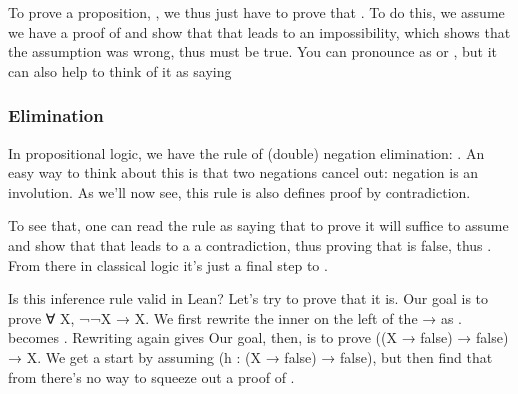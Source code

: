 \documentclass[letterpaper,10pt,english]{sphinxmanual}
\begin{document}
\sphinxAtStartPar
To prove a proposition, , we thus just have to prove that
. To do this, we assume we have a proof of  and
show that that leads to an impossibility, which shows that the
assumption was wrong, thus  must be true. You can pronounce
 as  or , but it can also help to think
of it as saying 

\begin{sphinxVerbatim}[commandchars=\\\{\}]
       
 
 

      
 
 

     
 
 
\end{sphinxVerbatim}


\subsubsection{Elimination}
\label{\detokenize{A_02_Constructive_Logic:elimination}}
\sphinxAtStartPar
In propositional logic, we have the rule of (double) negation
elimination: . An easy way to think about this is that
two negations cancel out: negation is an involution. As we’ll
now see, this rule is also defines proof by contradiction.

\sphinxAtStartPar
To see that, one can read the rule as saying that to prove 
it will suffice to assume  and show that that leads to a
a contradiction, thus proving that  is false, thus .
From there in classical logic it’s just a final step to .

\sphinxAtStartPar
Is this inference rule valid in Lean? Let’s try to prove that
it is. Our goal is to prove ∀ X, ¬¬X → X. We first rewrite the
inner  on the left of the → as .  becomes
. Rewriting again gives 
Our goal, then, is to prove ((X → false) → false) → X. We get
a start by assuming (h : (X → false) → false), but then find
that from  there’s no way to squeeze out a proof of .
\end{document}
